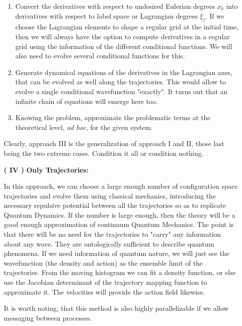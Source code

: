 \documentclass[11pt, a4paper]{article} %
\begin{document}
\begin{enumerate}
\begin{enumerate}
\item Convert the derivatives with respect to undesired Eulerian degrees $x_k$ into derivatives with respect to label space or Lagrangian degrees $\xi_j$. If we choose the Lagrangian elements to shape a regular grid at the initial time, then we will always have the option to compute derivatives in a regular grid using the information of the different conditional functions. We will also need to evolve several conditional functions for this.

\item Generate dynamical equations of the derivatives in the Lagrangian axes, that can be evolved as well along the trajectories. This would allow to evolve a single conditional wavefunction "exactly". It turns out that an infinite chain of equations will emerge here too.

\item Knowing the problem, approximate the problematic terms at the theoretical level, {\em ad hoc}, for the given system.
\end{enumerate}

Clearly, approach III is the generalization of approach I and II, those last being the two extreme cases. Condition it all or condition nothing.\vspace{0.2cm}

\item [\bf ( IV )] {\bf Only Trajectories:}\vspace{0.15cm}

In this approach, we can choose a large enough number of configuration space trajectories and evolve them using classical mechanics, introducing the necessary repulsive potential between all the trajectories so as to replicate Quantum Dynamics. If the number is large enough, then the theory will be a good enough approximation of continuum Quantum Mechanics. The point is that there will be no need for the trajectories to "carry" any information about any wave. They are ontologically sufficient to describe quantum phenomena. If we need information of quantum nature, we will just see the wavefunction (the density and action) as the ensemble limit of the trajectories. From the moving histogram we can fit a density function, or else use the Jacobian determinant of the trajectory mapping function to approximate it. The velocities will provide the action field likewise.

It is worth noting, that this method is also highly parallelizable if we allow messaging between processes.

\end{enumerate}
\end{document}
